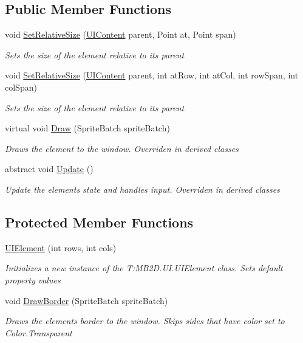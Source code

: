 \subsection*{Public Member Functions}
\begin{DoxyCompactItemize}
\item 
void \hyperlink{class_m_b2_d_1_1_u_i_1_1_u_i_element_a4c3d52b5993c5f1d6615d0535fdd9e19}{Set\+Relative\+Size} (\hyperlink{class_m_b2_d_1_1_u_i_1_1_u_i_content}{U\+I\+Content} parent, Point at, Point span)
\begin{DoxyCompactList}\small\item\em Sets the size of the element relative to its parent \end{DoxyCompactList}\item 
void \hyperlink{class_m_b2_d_1_1_u_i_1_1_u_i_element_ada6dd87befb618ea03e8a3d30ae3fea9}{Set\+Relative\+Size} (\hyperlink{class_m_b2_d_1_1_u_i_1_1_u_i_content}{U\+I\+Content} parent, int at\+Row, int at\+Col, int row\+Span, int col\+Span)
\begin{DoxyCompactList}\small\item\em Sets the size of the element relative to its parent \end{DoxyCompactList}\item 
virtual void \hyperlink{class_m_b2_d_1_1_u_i_1_1_u_i_element_afec98e6e38cb0dbc17a5db6d6a3d5ba5}{Draw} (Sprite\+Batch sprite\+Batch)
\begin{DoxyCompactList}\small\item\em Draws the element to the window. Overriden in derived classes \end{DoxyCompactList}\item 
abstract void \hyperlink{class_m_b2_d_1_1_u_i_1_1_u_i_element_aa97bcbe44f3fac8a13e2febca23b2d4d}{Update} ()
\begin{DoxyCompactList}\small\item\em Update the elements state and handles input. Overriden in derived classes \end{DoxyCompactList}\end{DoxyCompactItemize}
\subsection*{Protected Member Functions}
\begin{DoxyCompactItemize}
\item 
\hyperlink{class_m_b2_d_1_1_u_i_1_1_u_i_element_a508bd28173afc58ba1214672a013f802}{U\+I\+Element} (int rows, int cols)
\begin{DoxyCompactList}\small\item\em Initializes a new instance of the T\+:\+M\+B2\+D.\+U\+I.\+U\+I\+Element class. Sets default property values \end{DoxyCompactList}\item 
void \hyperlink{class_m_b2_d_1_1_u_i_1_1_u_i_element_a0a17b121a60ad05039f01eee006ae76c}{Draw\+Border} (Sprite\+Batch sprite\+Batch)
\begin{DoxyCompactList}\small\item\em Draws the elements border to the window. Skips sides that have color set to Color.\+Transparent \end{DoxyCompactList}\end{DoxyCompactItemize}
